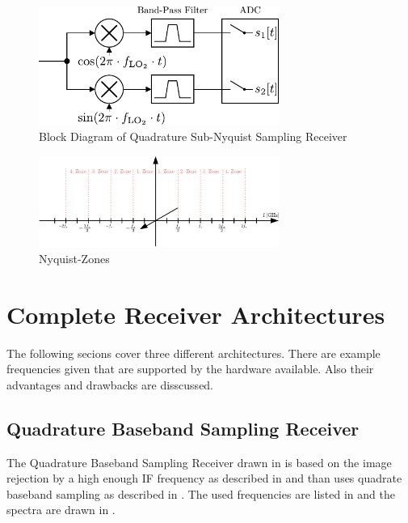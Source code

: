 \begin{figure}[h!]
  \centering
  \includegraphics[width=0.7\textwidth]{figures/rx_adc_2_bd}
  \caption{Block Diagram of Quadrature Sub-Nyquist Sampling Receiver}
  \label{fig:rx_adc_2_bd}
\end{figure}

\begin{figure}[h!]
  \centering
  \includegraphics[width=0.7\textwidth]{figures/rx_adc_2_nyquist_zones}
  \caption{Nyquist-Zones}
  \label{fig:rx_adc_2_bd}
\end{figure}

\section{Complete Receiver Architectures}
The following secions cover three different architectures. There are example
frequencies given that are supported by the hardware available. Also their
advantages and drawbacks are disscussed. \\

\subsection{Quadrature Baseband Sampling Receiver}
\label{sec:rx_0}
The Quadrature Baseband Sampling Receiver drawn in 
is based on the image rejection by a high enough \gls{IF} frequency as
described in  and than uses quadrate baseband sampling
as described in .
The used frequencies are listed in  and the spectra are drawn
in . \\

